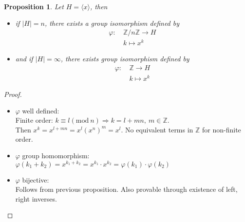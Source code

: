 \documentclass{article}
\newtheorem{theorem}{Proposition}[section]
\theoremstyle{definition}
\theoremstyle{remark}
\begin{document}
\begin{theorem}
	Let $H=\langle x\rangle$, then
	\begin{itemize}
		\item if $|H|=n$, there exists a group isomorphism defined by
		      \begin{align}
			      \varphi:~ & \mathbb{Z}/n\mathbb{Z}\rightarrow H \\
			                & k\mapsto x^k
		      \end{align}
		\item and if $|H|=\infty$, there exists group isomorphism defined by
		      \begin{align*}
			      \varphi:~ & \mathbb{Z}\rightarrow H \\
			                & k\mapsto x^k
		      \end{align*}
	\end{itemize}
\end{theorem}
\begin{proof}~
	\begin{itemize}
		\item $\varphi $ well defined:\\
		      Finite order: $k\equiv l (\mathrm{mod}~n)\Rightarrow k=l+mn,~m\in\mathbb{Z}.$\\
		      Then $x^k=x^{l+mn}=x^l(x^n)^m=x^l$. No equivalent terms in $\mathbb{Z}$ for non-finite order.
		\item $\varphi$ group homomorphism:\\
		      $\varphi(k_1+k_2)=x^{k_1+k_2}=x^{k_1}\cdot x^{k_2}=\varphi(k_1)\cdot\varphi(k_2)$
		\item  $\varphi$ bijective:\\
		      Follows from previous proposition. Also provable through existence of left, right inverses.
	\end{itemize}
\end{proof}
\newpage
\end{document}
